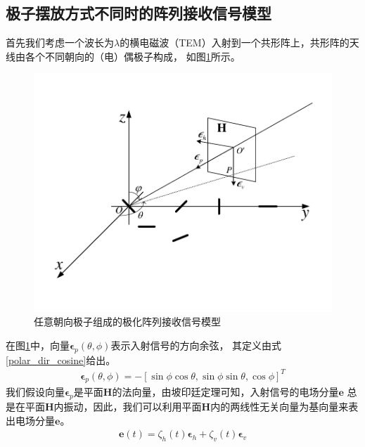 \documentclass[master]{thesis-uestc}
\begin{document}
\subsection{极子摆放方式不同时的阵列接收信号模型}
首先我们考虑一个波长为$\lambda$的横电磁波（TEM）入射到一个共形阵上，共形阵的天线由各个不同朝向的（电）偶极子构成，
如图\ref{polarized_array}所示。
\begin{figure}[h]
    \includegraphics[scale=0.8]{pic/polarized_array.pdf}
    \caption{任意朝向极子组成的极化阵列接收信号模型}
    \label{polarized_array}
\end{figure}
在图\ref{polarized_array}中，向量$\bm{\epsilon}_p(\theta,\phi)$表示入射信号的方向余弦，
其定义由式\eqref{polar_dir_cosine}给出。
\begin{equation}\label{polar_dir_cosine}
    \begin{aligned}
        \bm{\epsilon}_p(\theta,\phi) = 
        -\left[\sin\phi\cos\theta,\sin\phi\sin\theta,\cos\phi\right]^T
    \end{aligned}
\end{equation}
我们假设向量$\bm{\epsilon}_p$是平面$\bm{H}$的法向量，由坡印廷定理可知，入射信号的电场分量$\bm{e}$
总是在平面$\bm{H}$内振动，因此，我们可以利用平面$\bm{H}$内的两线性无关向量为基向量来表出电场分量$\bm{e}$。
\begin{equation}\label{polar_elect_comp}
    \begin{aligned}
        \bm{e}(t) = \zeta_h(t)\bm{\epsilon}_h + \zeta_v(t)\bm{\epsilon}_v
    \end{aligned}
\end{equation}
\end{document}
